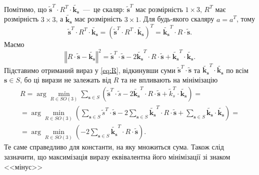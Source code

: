 Помітимо,
що $ \tilde{\boldsymbol{s}}^T \cdot R^T \cdot \tilde{\boldsymbol{k_s}} $~---~це скаляр:
$ \tilde{\boldsymbol{s}}^T$ має розмірність $1 \times 3, \, R^T$ має розмірність
$3 \times 3$, а $ \tilde{\boldsymbol{k_s}}$ має розмірність $3 \times 1$.
Для будь-якого скаляру $a = a^T$, тому
\begin{equation*}
  \tilde{\boldsymbol{s}}^T \cdot R^T \cdot \tilde{\boldsymbol{k_s}} =
  \left( \tilde{\boldsymbol{s}}^T \cdot R^T \cdot \tilde{\boldsymbol{k_s}} \right)^T =
  \tilde{\boldsymbol{k_s}}^T \cdot R \cdot \tilde{\boldsymbol{s}}.
\end{equation*}
Маємо
\begin{equation*}
  \left \Vert R \cdot \tilde{\boldsymbol{s}} - \tilde{\boldsymbol{k_s}} \right \Vert^2 =
  \tilde{\boldsymbol{s}}^T \cdot \tilde{\boldsymbol{s}} -
  2 \tilde{\boldsymbol{k_s}}^T \cdot R \cdot \tilde{\boldsymbol{s}} +
  \tilde{\boldsymbol{k_s}}^T \cdot \tilde{\boldsymbol{k_s}}.
\end{equation*}
Підставимо отриманий вираз у \eqref{eq:R},
відкинувши суми $ \tilde{\boldsymbol{s}}^T \cdot \tilde{\boldsymbol{s}}$ та
$ \tilde{\boldsymbol{k_s}}^T \cdot \tilde{\boldsymbol{k_s}}$ по всім $\boldsymbol{s} \in S$,
бо ці вирази не залежать від $R$ та не впливають на мінімізацію
\begin{equation*}
  \begin{gathered}
    R =
    \arg \min \limits_{R \in SO \left( 3 \right) }
      \sum \limits_{\boldsymbol{s} \in S}
        \left(
          \tilde{\boldsymbol{s}}^T \cdot \tilde{s} -
          2 \tilde{\boldsymbol{k_s}}^T \cdot R \cdot \tilde{\boldsymbol{s}} +
          \tilde{k}_s^T \cdot \tilde{\boldsymbol{k_s}}
        \right) = \\
    = \arg \min \limits_{R \in SO \left( 3 \right) }
      \left(
        \sum \limits_{\boldsymbol{s} \in S} \tilde{s}^T \cdot \tilde{\boldsymbol{s}} -
        2 \sum \limits_{\boldsymbol{s} \in S}
          \tilde{\boldsymbol{k_s}}^T \cdot R \cdot \tilde{\boldsymbol{s}} +
        \sum \limits_{\boldsymbol{s} \in S} \tilde{\boldsymbol{k_s}} \cdot \tilde{\boldsymbol{k_s}}
      \right) = \\
    = \arg \min \limits_{R \in SO \left( 3 \right) } \left(
      -2 \sum \limits_{\boldsymbol{s} \in S} \tilde{\boldsymbol{k_s}}^T \cdot R \cdot
      \tilde{\boldsymbol{s}}
    \right).
  \end{gathered}
\end{equation*}
Те саме справедливо для константи, на яку множиться сума.
Також слід зазначити,
що максимізація виразу еквівалентна його мінімізації зі знаком <<мінус>>
